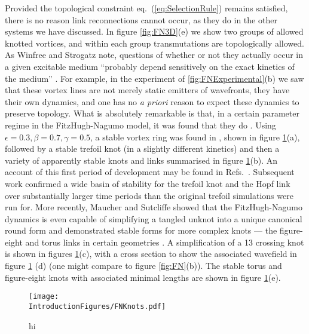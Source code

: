 Provided the topological constraint eq.~(\ref{eq:SelectionRule}) remains satisfied, there is no reason link reconnections cannot occur, as they do in the other systems we have discussed. In figure \ref{fig:FN3D}(e) we show two groups of allowed knotted vortices, and within each group transmutations are topologically allowed. As Winfree and Strogatz note, questions of whether or not they actually occur in a given excitable medium ``probably depend sensitively on the exact kinetics of the medium'' \citep{Winfree1984}. For example, in the experiment of \ref{fig:FNExperimental}(b)  \citep{Totz2015} we saw that these vortex lines are not merely static emitters of wavefronts, they have their own dynamics, and one has no \emph{a priori} reason to expect these dynamics to preserve topology. What is absolutely remarkable is that, in a certain parameter regime in the FitzHugh-Nagumo model, it was found that they do \citep{Winfree1990,Henze1993}. Using $\epsilon = 0.3, \beta = 0.7, \gamma=0.5$, a stable vortex ring was found in \citep{Courtemanche1990}, shown in figure \ref{fig:FNKnots}(a), followed by a stable trefoil knot \citep{Henze1991}(in a slightly different kinetics) and then a variety of apparently stable knots and links \citep{Henze1993} summarised in figure \ref{fig:FNKnots}(b). An account of this first period of development may be found in Refs.~\citep{Winfree1990, WinfreeBook,WinfreeChapter}. Subsequent work \citep{Sutcliffe2003} confirmed a wide basin of stability for the trefoil knot and the Hopf link over substantially larger time periods than the original trefoil simulations were run for. More recently, Maucher and Sutcliffe \citep{Maucher2016} showed that the FitzHugh-Nagumo dynamics is even capable of simplifying a tangled unknot into a unique canonical round form and demonstrated stable forms for more complex knots --- the figure-eight and torus links in certain geometries \citep{Maucher2017}. A simplification of a 13 crossing knot is shown in figures \ref{fig:FNKnots}(c), with a cross section to show the associated wavefield in figure \ref{fig:FNKnots} (d) (one might compare to figure \ref{fig:FN}(b)). The stable torus and figure-eight knots with associated minimal lengths are shown in figure \ref{fig:FNKnots}(e).
\begin{figure}[htbp]
\centering
\texttt{[image: \\IntroductionFigures/FNKnots.pdf]}
\caption{hi }
\label{fig:FNKnots}
\end{figure}
